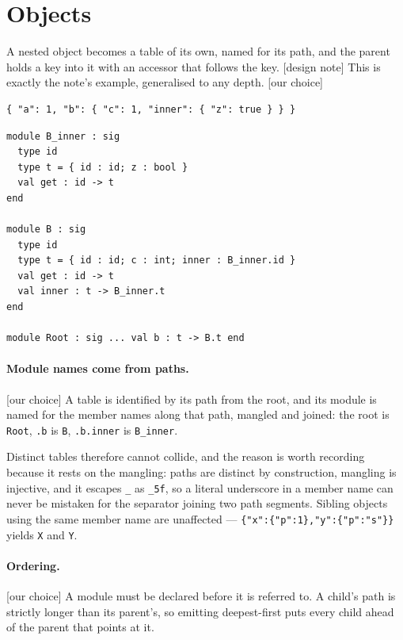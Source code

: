 \documentclass[11pt,a4paper]{article}
\newcommand{\fromnote}{\textcolor{note}{\textsf{[design note]}}}
\newcommand{\ourcall}{\textcolor{ours}{\textsf{[our choice]}}}
\begin{document}
\section{Objects}

A nested object becomes a table of its own, named for its path, and the parent
holds a key into it with an accessor that follows the key. \fromnote{} This is
exactly the note's example, generalised to any depth. \ourcall{}

\begin{lstlisting}[style=json]
{ "a": 1, "b": { "c": 1, "inner": { "z": true } } }
\end{lstlisting}

\begin{lstlisting}[style=ml]
module B_inner : sig
  type id
  type t = { id : id; z : bool }
  val get : id -> t
end

module B : sig
  type id
  type t = { id : id; c : int; inner : B_inner.id }
  val get : id -> t
  val inner : t -> B_inner.t
end

module Root : sig ... val b : t -> B.t end
\end{lstlisting}

\paragraph{Module names come from paths.} \ourcall{} A table is identified by
its path from the root, and its module is named for the member names along
that path, mangled and joined: the root is \texttt{Root}, \texttt{.b} is
\texttt{B}, \texttt{.b.inner} is \texttt{B\_inner}.

Distinct tables therefore cannot collide, and the reason is worth recording
because it rests on the mangling: paths are distinct by construction, mangling
is injective, and it escapes \texttt{\_} as \texttt{\_5f}, so a literal
underscore in a member name can never be mistaken for the separator joining
two path segments. Sibling objects using the same member name are unaffected
--- \texttt{\{"x":\{"p":1\},"y":\{"p":"s"\}\}} yields \texttt{X} and
\texttt{Y}.

\paragraph{Ordering.} \ourcall{} A module must be declared before it is
referred to. A child's path is strictly longer than its parent's, so emitting
deepest-first puts every child ahead of the parent that points at it.
\end{document}
